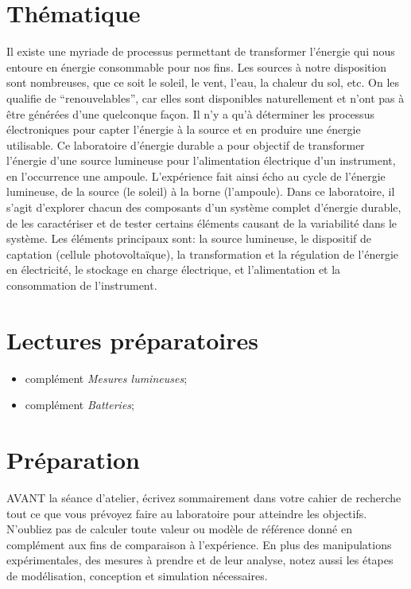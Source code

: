 \documentclass[canadien,12pt,oneside,letterpaper]{article}
\begin{document}
\section{Thématique}\label{sec:thematique}
\vspace{-2ex}
Il existe une myriade de processus permettant de transformer l’énergie qui nous entoure en énergie consommable pour nos fins. Les sources à notre disposition sont nombreuses, que ce soit le soleil, le vent, l’eau, la chaleur du sol, etc. On les qualifie de “renouvelables”, car elles sont disponibles naturellement et n’ont pas à être générées d’une quelconque façon. Il n’y a qu’à déterminer les processus électroniques pour capter l'énergie à la source et en produire une énergie utilisable. Ce laboratoire d'énergie durable a pour objectif de transformer l'énergie d'une source lumineuse pour l'alimentation électrique d'un instrument, en l'occurrence une ampoule. L'expérience fait ainsi écho au cycle de l'énergie lumineuse, de la source (le soleil) à la borne (l'ampoule). Dans ce laboratoire, il s'agit d'explorer chacun des composants d'un système complet d'énergie durable, de les caractériser et de tester certains éléments causant de la variabilité dans le système. Les éléments principaux sont: la source lumineuse, le dispositif de captation (cellule photovoltaïque), la transformation et la régulation de l'énergie en électricité, le stockage en charge électrique, et l'alimentation et la consommation de l'instrument.

\section{Lectures préparatoires}\label{sec:lectures preparatoires}
\vspace{-2ex}
\begin{itemize}
\item complément \textit{Mesures lumineuses};
\item complément \textit{Batteries};
\end{itemize}

\section{Préparation}\label{sec:preparation}
\vspace{-2ex}
AVANT la séance d’atelier, écrivez sommairement dans votre cahier de recherche
tout ce que vous prévoyez faire au laboratoire pour atteindre les objectifs. N’oubliez
pas de calculer toute valeur ou modèle de référence donné en complément aux fins de
comparaison à l’expérience. En plus des manipulations expérimentales, des mesures
à prendre et de leur analyse, notez aussi les étapes de modélisation, conception et
simulation nécessaires. 
\end{document}

